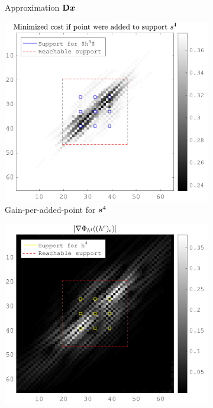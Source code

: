 \begin{figure}[!ht]
\begin{subfigure}[b]{0.49\textwidth}
\caption{Approximation $\mathbf{D}\bm{x}$} \label{fig_gain_n4_approx}
\end{subfigure}
\begin{subfigure}[b]{0.49\textwidth}\centering
\includegraphics[width=\textwidth]{figures/xp/n4/xp_128x128_sc2_angl1_K3_S3_node4_objmatrix.png}
\caption{Gain-per-added-point for $\bm{s}^4$}
\end{subfigure}
\begin{subfigure}[b]{0.49\textwidth}\centering
\includegraphics[width=\textwidth]{figures/xp/n4/xp_128x128_sc2_angl1_K3_S3_node4_partgrad4.png}

\end{subfigure}
\end{figure}
